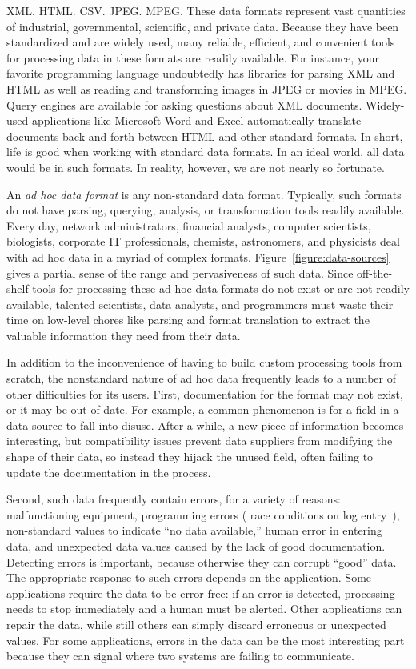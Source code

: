 XML. HTML. CSV. JPEG. MPEG.  These data formats
represent vast quantities of industrial, governmental,
scientific, and private data.  Because they have been standardized
and are widely used, many reliable, efficient, and
convenient tools for processing data in these formats are
readily available.  For instance, your favorite programming language
undoubtedly has libraries for parsing XML and HTML as well as
reading and transforming images in JPEG or movies in MPEG.  Query engines
are available for asking questions about XML documents.
Widely-used applications like Microsoft Word and Excel automatically
translate documents back and forth between HTML and other
standard formats.  In short, life is good when working with standard data formats. In an ideal world, all data would be in such formats. In reality, however, we are not nearly so fortunate.

An {\em ad hoc data format} is any non-standard data format.  Typically, such formats do not have parsing,
querying, analysis, or transformation tools readily available.
Every day, network administrators, financial analysts, computer
scientists, biologists, corporate IT professionals, chemists, astronomers, and
physicists deal with ad hoc data in a myriad of complex formats.
Figure~\ref{figure:data-sources} gives a partial sense of the range
and pervasiveness of such data.  Since off-the-shelf
tools for processing these ad hoc data formats do not exist
or are not readily available, talented scientists, data analysts, and
programmers must waste their time 
on low-level chores like parsing and format translation
to extract the valuable information they need from their data.

In addition to the inconvenience of having to build custom
processing tools from scratch, the nonstandard nature of ad hoc data
frequently leads to a number of other difficulties for its users.
First, documentation for the format may not exist, or it may be out of
date.  For example, a common phenomenon is for a field in a data source to fall
into disuse.  After a while, a new piece of information becomes
interesting, but compatibility issues prevent data suppliers from
modifying the shape of their data, so instead they hijack the unused
field, often failing to update the documentation in the process.

Second, such data frequently contain errors, for a variety of reasons:
malfunctioning equipment, programming errors (\eg{} race conditions on
log entry~\cite{wpp}), non-standard values to indicate ``no data
available,'' human error in entering data, and unexpected data values
caused by the lack of good documentation.  Detecting errors is important, because otherwise they can corrupt ``good'' data.
The appropriate response to such errors depends on the application. Some applications require the data
to be error free: if an error is detected, processing needs to stop
immediately and a human must be alerted.  Other applications can
repair the data, while still others can simply discard erroneous or
unexpected values.  For some applications, errors in the data can be
the most interesting part because they can signal where two systems
are failing to communicate.

